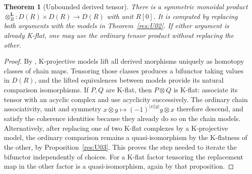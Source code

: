 \documentclass[11pt,oneside,openany]{book}
\newtheorem{theorem}{Theorem}[chapter]
\theoremstyle{definition}
\theoremstyle{remark}
\begin{document}
\begin{theorem}[Unbounded derived tensor]\label{res:U07}
There is a symmetric monoidal product
\(\otimes_R^{\mathbf L}:D(R)\times D(R)\to D(R)\) with unit \(R[0]\).
It is computed by replacing both arguments with the models in
Theorem~\ref{res:U02}. If either argument is already K-flat, one
may use the ordinary tensor product without replacing the other.
\end{theorem}
\begin{proof}
By \cite[R04]{ha-core}, K-projective models lift all derived
morphisms uniquely as homotopy classes of chain maps.
Tensoring those classes produces a bifunctor taking values in
\(D(R)\), and the lifted equivalences between models provide its
natural comparison isomorphisms. If \(P,Q\) are K-flat, then
\(P\otimes Q\) is K-flat: associate its tensor with an acyclic
complex and use acyclicity successively. The ordinary chain
associativity, unit and symmetry
\(x\otimes y\mapsto(-1)^{|x||y|}y\otimes x\)
therefore descend, and satisfy the coherence identities because
they already do so on the chain models. Alternatively, after
replacing one of two K-flat complexes by a K-projective model,
the ordinary comparison remains a quasi-isomorphism by the
K-flatness of the other, by Proposition~\ref{res:U03}.
This proves the step needed to iterate the bifunctor independently
of choices. For a K-flat factor tensoring the replacement map in
the other factor is a quasi-isomorphism, again by that proposition.
\end{proof}
\end{document}
